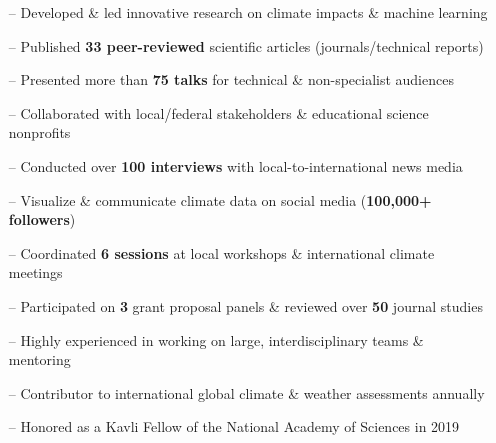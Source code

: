 \documentclass[10pt,letterpaper]{altacv} %
\begin{document}

%

\begin{fullwidth}
\makecvheader
\end{fullwidth}

%

\vspace{-0.09in}
\begin{itemize}
    \setlength{\itemindent}{0.5em}
    \item[--] \small{Developed \& led innovative research on climate impacts \& machine learning}
    \item[--] \small{Published \textbf{33 peer-reviewed} scientific articles (journals/technical reports)}
    \item[--] \small{Presented more than \textbf{75 talks} for technical \& non-specialist audiences}
    \item[--] \small{Collaborated with local\slash federal stakeholders \& educational science nonprofits}
    \item[--] \small{Conducted over \textbf{100 interviews} with local-to-international news media}
    \item[--] \small{Visualize \& communicate climate data on social media (\textbf{100,000+ followers})}
    \item[--] \small{Coordinated \textbf{6 sessions} at local workshops \& international climate meetings}
    \item[--] \small{Participated on \textbf{3} grant proposal panels \& reviewed over \textbf{50} journal studies}
    \item[--] \small{Highly experienced in working on large, interdisciplinary teams \& mentoring}
    \item[--] \small{Contributor to international global climate \& weather assessments annually}
    \item[--] \small{Honored as a Kavli Fellow of the National Academy of Sciences in 2019}
\end{itemize}
\smallskip
\end{document}
